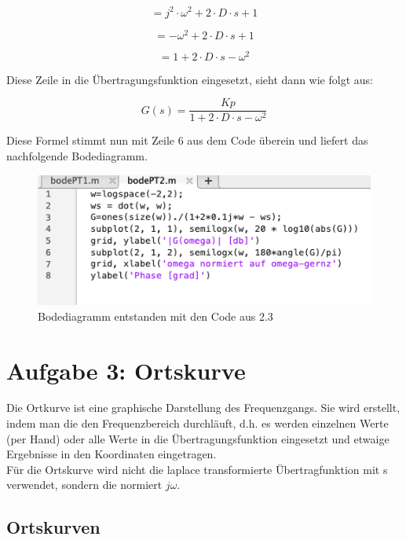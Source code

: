 \documentclass{article}
\begin{document}
			$$= j^2 \cdot \omega^2 + 2 \cdot D \cdot s + 1 $$

			$$= - \omega^2 + 2 \cdot D \cdot s + 1$$

			$$= 1 + 2 \cdot D \cdot s - \omega^2 $$
			
			Diese Zeile in die Übertragungsfunktion eingesetzt, sieht dann wie folgt aus:
			
			$$G(s) = \frac{Kp}{1 + 2 \cdot D \cdot s - \omega^2}$$
			
			Diese Formel stimmt nun mit Zeile 6 aus dem Code überein und liefert das nachfolgende Bodediagramm.
			\begin{figure}
				\includegraphics[scale = 0.3]{./bodePT2.png}
				\caption{Bodediagramm entstanden mit den Code aus 2.3}
				\label{fig2: Bodediagramm}
			\end{figure}
\newpage
	\section{Aufgabe 3: Ortskurve}
		Die Ortkurve ist eine graphische Darstellung des Frequenzgangs. Sie wird erstellt, indem man die den Frequenzbereich durchläuft, d.h. es werden einzelnen Werte (per Hand) oder alle Werte in die Übertragungsfunktion eingesetzt und etwaige Ergebnisse in den Koordinaten eingetragen.\\
		Für die Ortskurve wird nicht die laplace transformierte Übertragfunktion mit s verwendet, sondern die normiert $j\omega$.
	
		\subsection{Ortskurven}
\end{document}
